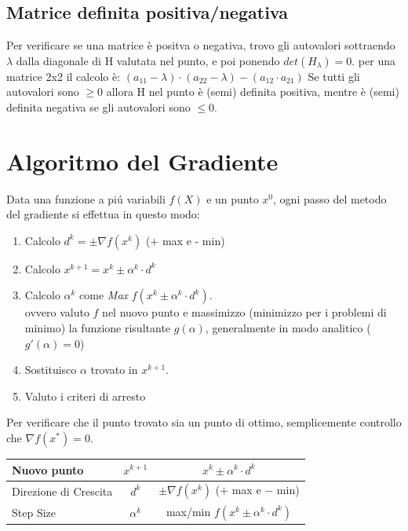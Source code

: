 \documentclass[12pt, a4paper, openany]{book}
\begin{document}
\subsection{Matrice definita positiva/negativa}
Per verificare se una matrice è positva o negativa, trovo gli autovalori sottraendo $\lambda$ dalla diagonale di H valutata nel punto, e poi ponendo $det(H_\lambda) = 0$.
per una matrice 2x2 il calcolo è: $(a_{11}-\lambda)\cdot(a_{22} - \lambda) - (a_{12} \cdot a_{21})$
Se tutti gli autovalori sono $\geq 0$ allora H nel punto è (semi) definita positiva, mentre è (semi) definita negativa se gli autovalori sono $\leq 0$.

\section{Algoritmo del Gradiente}
Data una funzione a piú variabili $f(X)$ e un punto $x^0$, ogni passo del metodo del gradiente si effettua in questo modo:

\begin{enumerate}
	\item Calcolo $d^k=\pm \nabla f(x^k)$ ($+$ max e - min)
	\item Calcolo $x^{k+1} = x^k \pm \alpha^k \cdot d^k$
	\item Calcolo $\alpha^k$ come \emph{Max} $f(x^k \pm \alpha^k \cdot d^k)$.
			\\\small{ovvero valuto $f$ nel nuovo punto e massimizzo (minimizzo per i problemi di minimo) la funzione risultante $g(\alpha)$, generalmente in modo analitico ($g'(\alpha)=0$)}
	\item Sostituisco $\alpha$ trovato in $x^{k+1}$.
	\item Valuto i criteri di arresto
\end{enumerate}
Per verificare che il punto trovato sia un punto di ottimo, semplicemente controllo che $\nabla f(x^*) = 0$.
\begin{center}
	\begin{tabular}{|l|c|c|}
		\hline
		Nuovo punto & $x^{k+1}$ & $ x^k \pm \alpha^k \cdot d^k$\\
		\hline
		Direzione di Crescita & $d^k$ & $\pm \nabla f(x^k)$ ($+$ max e $-$ min)\\
		\hline
		Step Size & $\alpha^k$ & max/min $f(x^k \pm \alpha^k \cdot d^k)$\\
		\hline
	\end{tabular}
\end{center}

\pagebreak
\end{document}
